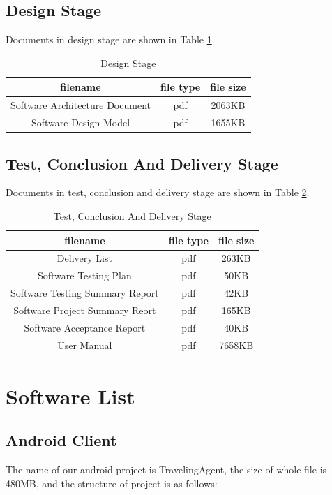 \documentclass[10pt]{article}
\begin{document}
\subsection{Design Stage}
Documents in design stage are shown in Table \ref{Design Stage}.
\begin{table}[htb]
	\centering

	\begin{tabular}{c|c|c} 
		\hline 
		filename&file type&file size\\
		\hline  
Software Architecture Document&pdf&2063KB\\
\hline
Software Design Model&pdf&1655KB\\
\hline
\end{tabular}
\caption{Design Stage}
\label{Design Stage}
\end{table}

\subsection{Test, Conclusion And Delivery Stage}
Documents in test, conclusion and delivery stage are shown in Table \ref{Test, Conclusion And Delivery Stage}.
\begin{table}[htb]
	\centering

	\begin{tabular}{c|c|c} 
		\hline 
		filename&file type&file size\\
		\hline  
Delivery List&pdf&263KB\\
\hline
Software Testing Plan&pdf&50KB\\
\hline
Software Testing Summary Report&pdf&42KB\\
\hline
Software Project Summary Reort&pdf&165KB\\
\hline
Software Acceptance Report&pdf&40KB\\
\hline
User Manual&pdf&7658KB\\
\hline
\end{tabular}
\caption{Test, Conclusion And Delivery Stage}
\label{Test, Conclusion And Delivery Stage}
\end{table}

\section{Software List}
\subsection{Android Client}
The name of our android project is TravelingAgent, the size of whole file is 480MB, and the structure of project is as follows:
\end{document}
